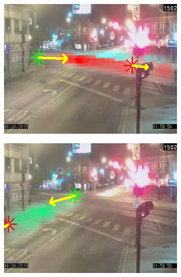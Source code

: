 \begin{figure}
    \centering
        \begin{subfigure}{0.32\linewidth}
            \includegraphics[width=\linewidth]{./img/scene_learning/res/elstonIrvingPark-short/20150829_020000DST_elstonIrvingPark-0.jpg}
        \end{subfigure}
        \begin{subfigure}{0.32\linewidth}
            \includegraphics[width=\linewidth]{./img/scene_learning/res/elstonIrvingPark-short/20150829_020000DST_elstonIrvingPark-1.jpg}
        \end{subfigure}
        \begin{subfigure}{0.32\linewidth}

\end{subfigure}
\end{figure}
